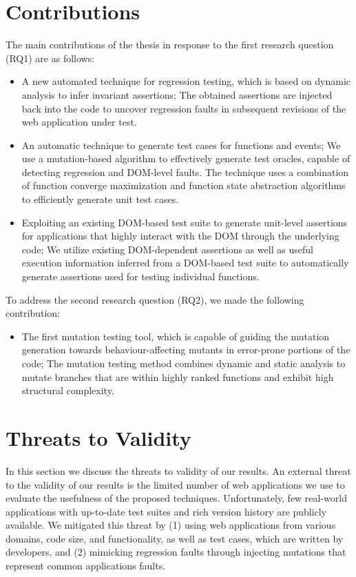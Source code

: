 \section{Contributions}
The main contributions of the thesis in response to the first research question (RQ1) are as follows: 
\begin{itemize}
\item A new automated technique for \javascript regression testing, which is based on dynamic analysis to infer invariant assertions; The obtained assertions are injected back into the \javascript code to uncover regression faults in subsequent revisions of the web application under test. 
\item An automatic technique to generate test cases for \javascript functions and events; We use a mutation-based algorithm to effectively generate test oracles, capable of detecting regression \javascript and DOM-level faults. The technique uses a combination of function converge maximization and function state abstraction algorithms to efficiently generate unit test cases.
\item Exploiting an existing DOM-based test suite to generate unit-level assertions for applications that highly interact with the DOM through the underlying \javascript code; We utilize
existing DOM-dependent assertions as well as useful execution information inferred from a DOM-based test suite to automatically generate assertions used for testing individual \javascript functions.
\end{itemize}
To address the second research question (RQ2), we made the following contribution:
\begin{itemize}
\item The first \javascript mutation testing tool, which is capable of guiding the mutation generation towards behaviour-affecting mutants in error-prone portions of the code; The mutation testing method combines dynamic and static analysis to mutate branches that are within highly ranked functions and exhibit high structural complexity.
\end{itemize}
\section{Threats to Validity}
In this section we discuss the threats to validity of our results.
An external threat to the validity of our results is the limited number 
of web applications we use to evaluate the usefulness of the proposed techniques.
Unfortunately, few real-world \javascript applications with up-to-date test suites and rich version history are publicly available. We mitigated this threat by (1) using web applications from various domains, code size, and functionality, as well as \selenium test cases, which are written by developers, and (2) mimicking regression faults through injecting mutations that represent common \javascript applications faults.

